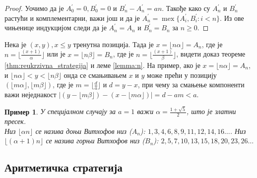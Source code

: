 \documentclass[a4paper]{article}
\newtheorem{example}{Пример}
\DeclareMathOperator{\mex}{mex}
\begin{document}
\begin{proof}
	Уочимо да је $ A^{'}_{0} = 0, B^{'}_{0} = 0 $ и $ B^{'}_{n} - A^{'}_{n} = an $. Такође како су $ A^{'}_{n} $ и $ B^{'}_{n} $ растући и комплементарни, важи још и да је $ A^{'}_{n} = \mex \{ A^{'}_{i}, B^{'}_{i} : i < n \} $. Из ове чињенице индукцијом следи да је $ A^{'}_{n} = A_{n} $ и $ B^{'}_{n} = B_{n}  $ за $ n \ge 0 $.
\end{proof}

Нека је $ (x, y), x \leq y $ тренутна позиција. Тада је $ x = \lfloor n \alpha \rfloor = A_{n} $, где је $ n = \lfloor \frac{(x+1)}{\alpha} \rfloor $ или је $ x = \lfloor n \beta \rfloor = B_{n} $, где је $ n = \lfloor \frac{(x+1)}{\beta} \rfloor $, видети доказ теореме \ref{thm:reukrzivna_strategija} и леме \ref{lemma:n}. На пример, ако је $ x = \lfloor n \alpha \rfloor = A_{n} $, и $ \lfloor n \alpha \rfloor < y < \lfloor n \beta \rfloor $ онда се смањивањем $ x $ и $ y $ може прећи у позицију $ (\lfloor m \alpha \rfloor, \lfloor m \beta \rfloor) $, где је $ m = \lfloor \frac{d}{a} \rfloor $ и $ d = y - x $, при чему за смањење компоненти важи неједнакост $ |(y - \lfloor m \beta \rfloor) - (x - \lfloor m \alpha \rfloor)| = d - am < a $.

\begin{example}
	У специјалном случају за $ a = 1 $ важи $ \alpha = \frac{1 + \sqrt{5}}{2} $, што је златни пресек.\\	
	Низ $ \lfloor \alpha n \rfloor $ се назива доњи Витхофов низ ($ A_{n} $):
	$ 1, 3, 4, 6, 8, 9, 11, 12, 14, 16 \ldots $. Низ $ \lfloor (\alpha + 1) n \rfloor $ се назива горњи Витхофов низ ($ B_{n} $):
	$ 2, 5, 7, 10, 13, 15, 18, 20, 23, 26 \ldots $
\end{example}

\subsection{Аритметичка стратегија}
\end{document}
